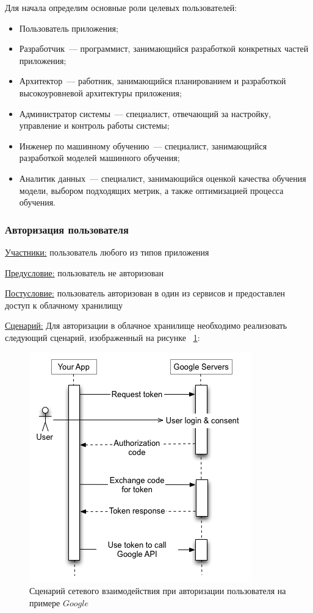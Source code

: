 Для начала определим основные роли целевых пользователей:
\begin{itemize}
    \item Пользователь приложения;
    \item Разработчик~--- программист, занимающийся разработкой конкретных частей приложения;
    \item Архитектор~--- работник, занимающийся планированием и разработкой высокоуровневой архитектуры приложения;
    \item Администратор системы~--- специалист, отвечающий за настройку, управление и контроль работы системы;
    \item Инженер по машинному обучению~--- специалист, занимающийся разработкой моделей машинного обучения;
    \item Аналитик данных~--- специалист, занимающийся оценкой качества обучения модели, выбором подходящих метрик, а также оптимизацией процесса обучения.
\end{itemize}

\subsubsection{Авторизация пользователя}
\underline{Участники:} пользователь любого из типов приложения

\underline{Предусловие:} пользователь не авторизован

\underline{Постусловие:} пользователь авторизован в один из сервисов и предоставлен доступ к облачному хранилищу

\underline{Сценарий:}
Для авторизации в облачное хранилище необходимо реализовать следующий сценарий, изображенный на рисунке ~\ref{auth}:

\begin{figure}
    \includegraphics[scale=0.5]{img/use_cases/authorization.png}
    \caption{Сценарий сетевого взаимодействия при авторизации пользователя \cite{OAuth_google} на примере $Google$}
    \label{auth}
\end{figure}

